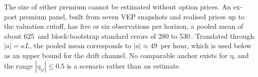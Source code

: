 The size of either premium cannot be estimated without option prices. An
ex-post premium panel, built from seven VEP snapshots and realised prices up
to the valuation cutoff, has five or six observations per horizon, a pooled
mean of about $625$\,\TRY{} and block-bootstrap standard errors of 280 to
530\,\TRY. Translated through $|a|=\kappa L$, the pooled mean corresponds to
$|a|\approx 49$\,\TRY{} per hour, which is used below as an upper bound for the
drift channel. No comparable anchor exists for $\eta$, and the range
$|\eta_{ij}|\le0.5$ is a scenario rather than an estimate.
